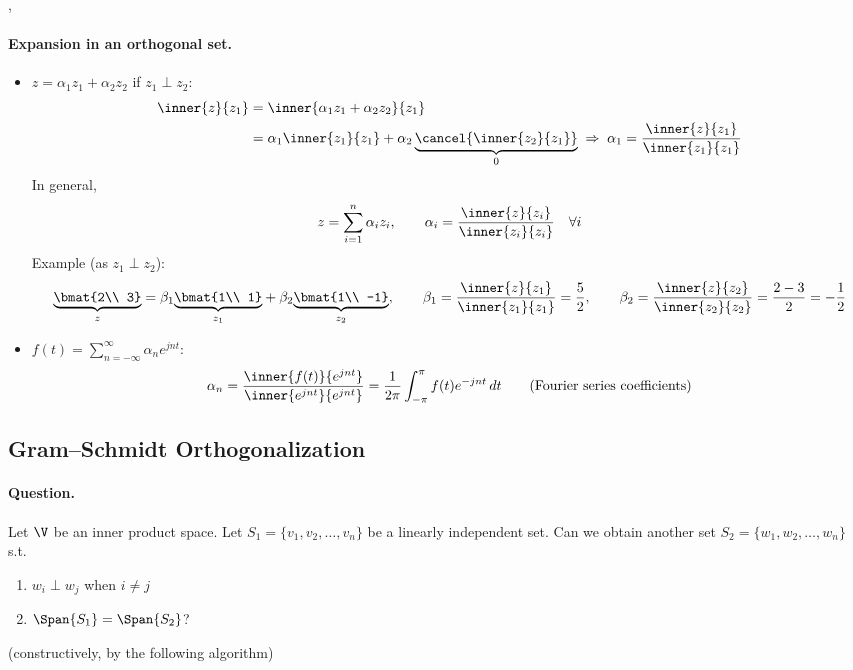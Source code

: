 \sep
\paragraph{Expansion in an orthogonal set.}
\begin{itemize}
\item[$\blacktriangleright$]
$z = \alpha_1 z_1 + \alpha_2 z_2$ \quad if $z_1\perp z_2$:
\begin{align*}
\inner{z}{z_1} &= \inner{\alpha_1 z_1 + \alpha_2 z_2}{z_1}\\
&= \alpha_1\inner{z_1}{z_1} + \alpha_2\underbrace{\cancel{\inner{z_2}{z_1}}}_{0} \;\Rightarrow\; \alpha_1 = \frac{\inner{z}{z_1}}{\inner{z_1}{z_1}}
\end{align*}
In general,
\[
z = \sum_{i=1}^n \alpha_i z_i, \qquad \alpha_i = \frac{\inner{z}{z_i}}{\inner{z_i}{z_i}} \quad \forall i
\]
Example (as $z_1\perp z_2$):
\[
{\underbrace{\bmat{2\\ 3}}_{z}} = \beta_1{\underbrace{\bmat{1\\ 1}}_{z_1}} + \beta_2{\underbrace{\bmat{1\\ -1}}_{z_2}},
\qquad
\beta_1 = \frac{\inner{z}{z_1}}{\inner{z_1}{z_1}} = \frac{5}{2},
\qquad
\beta_2 = \frac{\inner{z}{z_2}}{\inner{z_2}{z_2}} = \frac{2-3}{2} = -\frac12
\]
\item[$\blacktriangleright$]
$f(t) = \sum_{n=-\infty}^{\infty}\alpha_n e^{jnt}$:
\[
\alpha_n = \frac{\inner{f(t)}{e^{jnt}}}{\inner{e^{jnt}}{e^{jnt}}} = \frac{1}{2\pi}\int_{-\pi}^{\pi} f(t)e^{-jnt}\,dt \qquad \text{(Fourier series coefficients)}
\]
\end{itemize}

\subsection{Gram--Schmidt Orthogonalization}\label{ss:gram-schmidt}
%
\paragraph{Question.} Let $\V$ be an inner product space. Let $S_1 = \{v_1, v_2, \ldots, v_n\}$ be a linearly independent set. Can we obtain another set $S_2 = \{w_1, w_2, \ldots, w_n\}$ s.t.
\begin{enumerate}[label=\arabic*)]
\item $w_i\perp w_j$ when $i\neq j$
\item $\Span\{S_1\} = \Span\{S_2\}$?
\end{enumerate}
 (constructively, by the following algorithm)

